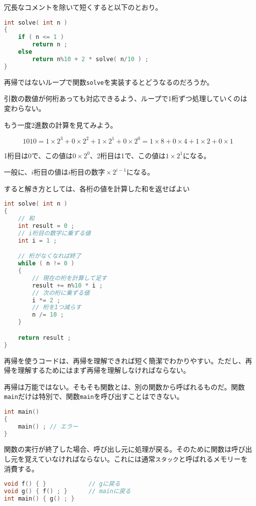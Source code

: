 冗長なコメントを除いて短くすると以下のとおり。

\begin{lstlisting}[language={C++}]
int solve( int n )
{
    if ( n <= 1 )
        return n ;
    else
        return n%10 + 2 * solve( n/10 ) ;
}
\end{lstlisting}

再帰ではないループで関数\texttt{solve}を実装するとどうなるのだろうか。

引数の数値が何桁あっても対応できるよう、ループで1桁ずつ処理していくのは変わらない。

もう一度2進数の計算を見てみよう。

\[
1010 = 1 \times 2^3 + 0 \times 2^2 + 1 \times 2^1 + 0 \times 2^0 = 1 \times 8 + 0 \times 4 + 1 \times 2 + 0 \times 1
\]

1桁目は0で、この値は\(0 \times 2^0\)、2桁目は1で、この値は\(1 \times 2^1\)になる。

一般に、\(i\)桁目の値は\(i桁目の数字 \times 2^{i-1}\)になる。

すると解き方としては、各桁の値を計算した和を返せばよい

\begin{lstlisting}[language={C++}]
int solve( int n )
{
    // 和
    int result = 0 ;
    // i桁目の数字に乗ずる値
    int i = 1 ;

    // 桁がなくなれば終了
    while ( n != 0 )
    {
        // 現在の桁を計算して足す
        result += n%10 * i ;
        // 次の桁に乗ずる値
        i *= 2 ;
        // 桁を1つ減らす
        n /= 10 ;
    }

    return result ;
}
\end{lstlisting}

再帰を使うコードは、再帰を理解できれば短く簡潔でわかりやすい。ただし、再帰を理解するためにはまず再帰を理解しなければならない。

再帰は万能ではない。そもそも関数とは、別の関数から呼ばれるものだ。関数\texttt{main}だけは特別で、関数\texttt{main}を呼び出すことはできない。

\begin{lstlisting}[language={C++}]
int main()
{
    main() ; // エラー
}
\end{lstlisting}

関数の実行が終了した場合、呼び出し元に処理が戻る。そのために関数は呼び出し元を覚えていなければならない。これには通常\texttt{スタック}と呼ばれるメモリーを消費する。

\ifTombow\pagebreak\fi
\begin{lstlisting}[language={C++}]
void f() { }            // gに戻る
void g() { f() ; }      // mainに戻る 
int main() { g() ; }
\end{lstlisting}

